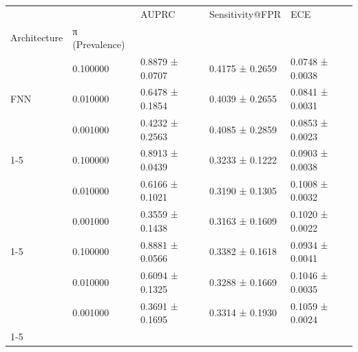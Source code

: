 \begin{tabular}{lllll}
\toprule
 &  & AUPRC & Sensitivity@FPR & ECE \\
Architecture & π (Prevalence) &  &  &  \\
\midrule
\multirow[t]{3}{*}{FNN} & 0.100000 & 0.8879 ± 0.0707 & 0.4175 ± 0.2659 & 0.0748 ± 0.0038 \\
 & 0.010000 & 0.6478 ± 0.1854 & 0.4039 ± 0.2655 & 0.0841 ± 0.0031 \\
 & 0.001000 & 0.4232 ± 0.2563 & 0.4085 ± 0.2859 & 0.0853 ± 0.0023 \\
\midrule
\cline{1-5}
\multirow[t]{3}{*}{LSTM} & 0.100000 & 0.8913 ± 0.0439 & 0.3233 ± 0.1222 & 0.0903 ± 0.0038 \\
 & 0.010000 & 0.6166 ± 0.1021 & 0.3190 ± 0.1305 & 0.1008 ± 0.0032 \\
 & 0.001000 & 0.3559 ± 0.1438 & 0.3163 ± 0.1609 & 0.1020 ± 0.0022 \\
\midrule
\cline{1-5}
\multirow[t]{3}{*}{Transformer} & 0.100000 & 0.8881 ± 0.0566 & 0.3382 ± 0.1618 & 0.0934 ± 0.0041 \\
 & 0.010000 & 0.6094 ± 0.1325 & 0.3288 ± 0.1669 & 0.1046 ± 0.0035 \\
 & 0.001000 & 0.3691 ± 0.1695 & 0.3314 ± 0.1930 & 0.1059 ± 0.0024 \\
\cline{1-5}
\bottomrule
\end{tabular}
